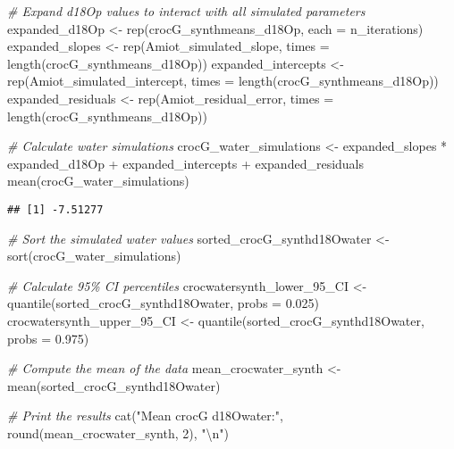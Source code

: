 \documentclass[
]{article}
\newenvironment{Shaded}{\begin{snugshade}}{\end{snugshade}}
\newcommand{\AttributeTok}[1]{\textcolor[rgb]{0.77,0.63,0.00}{#1}}
\newcommand{\CommentTok}[1]{\textcolor[rgb]{0.56,0.35,0.01}{\textit{#1}}}
\newcommand{\DecValTok}[1]{\textcolor[rgb]{0.00,0.00,0.81}{#1}}
\newcommand{\FloatTok}[1]{\textcolor[rgb]{0.00,0.00,0.81}{#1}}
\newcommand{\FunctionTok}[1]{\textcolor[rgb]{0.00,0.00,0.00}{#1}}
\newcommand{\NormalTok}[1]{#1}
\newcommand{\OtherTok}[1]{\textcolor[rgb]{0.56,0.35,0.01}{#1}}
\newcommand{\SpecialCharTok}[1]{\textcolor[rgb]{0.00,0.00,0.00}{#1}}
\newcommand{\StringTok}[1]{\textcolor[rgb]{0.31,0.60,0.02}{#1}}
\begin{document}
\begin{Shaded}
\begin{Highlighting}[]
\CommentTok{\# Expand d18Op values to interact with all simulated parameters}
\NormalTok{expanded\_d18Op }\OtherTok{\textless{}{-}} \FunctionTok{rep}\NormalTok{(crocG\_synthmeans\_d18Op, }\AttributeTok{each =}\NormalTok{ n\_iterations)}
\NormalTok{expanded\_slopes }\OtherTok{\textless{}{-}} \FunctionTok{rep}\NormalTok{(Amiot\_simulated\_slope, }\AttributeTok{times =} \FunctionTok{length}\NormalTok{(crocG\_synthmeans\_d18Op))}
\NormalTok{expanded\_intercepts }\OtherTok{\textless{}{-}} \FunctionTok{rep}\NormalTok{(Amiot\_simulated\_intercept, }\AttributeTok{times =} \FunctionTok{length}\NormalTok{(crocG\_synthmeans\_d18Op))}
\NormalTok{expanded\_residuals }\OtherTok{\textless{}{-}} \FunctionTok{rep}\NormalTok{(Amiot\_residual\_error, }\AttributeTok{times =} \FunctionTok{length}\NormalTok{(crocG\_synthmeans\_d18Op))}

\CommentTok{\# Calculate water simulations}
\NormalTok{crocG\_water\_simulations }\OtherTok{\textless{}{-}}\NormalTok{ expanded\_slopes }\SpecialCharTok{*}\NormalTok{ expanded\_d18Op }\SpecialCharTok{+}\NormalTok{ expanded\_intercepts }\SpecialCharTok{+}\NormalTok{ expanded\_residuals}
\FunctionTok{mean}\NormalTok{(crocG\_water\_simulations)}
\end{Highlighting}
\end{Shaded}

\begin{verbatim}
## [1] -7.51277
\end{verbatim}

\begin{Shaded}
\begin{Highlighting}[]
\CommentTok{\# Sort the simulated water values}
\NormalTok{sorted\_crocG\_synthd18Owater }\OtherTok{\textless{}{-}} \FunctionTok{sort}\NormalTok{(crocG\_water\_simulations)}

\CommentTok{\# Calculate 95\% CI percentiles}
\NormalTok{crocwatersynth\_lower\_95\_CI }\OtherTok{\textless{}{-}} \FunctionTok{quantile}\NormalTok{(sorted\_crocG\_synthd18Owater, }\AttributeTok{probs =} \FloatTok{0.025}\NormalTok{)}
\NormalTok{crocwatersynth\_upper\_95\_CI }\OtherTok{\textless{}{-}} \FunctionTok{quantile}\NormalTok{(sorted\_crocG\_synthd18Owater, }\AttributeTok{probs =} \FloatTok{0.975}\NormalTok{)}

\CommentTok{\# Compute the mean of the data}
\NormalTok{mean\_crocwater\_synth }\OtherTok{\textless{}{-}} \FunctionTok{mean}\NormalTok{(sorted\_crocG\_synthd18Owater)}

\CommentTok{\# Print the results}
\FunctionTok{cat}\NormalTok{(}\StringTok{"Mean crocG d18Owater:"}\NormalTok{, }\FunctionTok{round}\NormalTok{(mean\_crocwater\_synth, }\DecValTok{2}\NormalTok{), }\StringTok{"}\SpecialCharTok{\textbackslash{}n}\StringTok{"}\NormalTok{)}
\end{Highlighting}
\end{Shaded}
\end{document}
